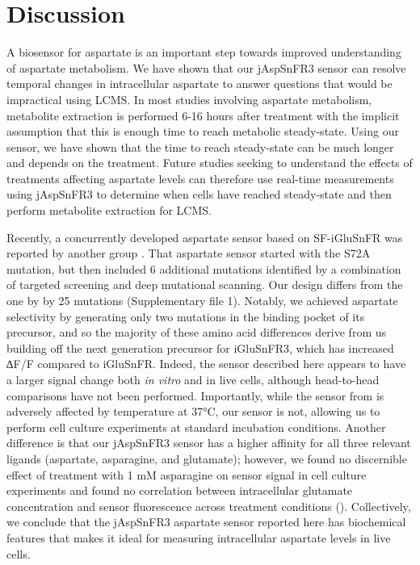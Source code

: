 \documentclass[9pt,lineno]{elife}
\begin{document}
\section{Discussion}
A biosensor for aspartate is an important step towards improved understanding of aspartate metabolism.
We have shown that our jAspSnFR3 sensor can resolve temporal changes in intracellular aspartate to answer questions that would be impractical using LCMS.
In most studies involving aspartate metabolism, metabolite extraction is performed 6-16 hours after treatment with the implicit assumption that this is enough time to reach metabolic steady-state.
Using our sensor, we have shown that the time to reach steady-state can be much longer and depends on the treatment.
Future studies seeking to understand the effects of treatments affecting aspartate levels can therefore use real-time measurements using jAspSnFR3 to determine when cells have reached steady-state and then perform metabolite extraction for LCMS.

Recently, a concurrently developed aspartate sensor based on SF-iGluSnFR was reported by another group \citep{Hellweg2023}.
That aspartate sensor started with the S72A mutation, but then included 6 additional mutations identified by a combination of targeted screening and deep mutational scanning.
Our design differs from the one by \cite{Hellweg2023} by 25 mutations (Supplementary file 1).
Notably, we achieved aspartate selectivity by generating only two mutations in the binding pocket of its precursor, and so the majority of these amino acid differences derive from us building off the next generation precursor for iGluSnFR3, which has increased ∆F/F compared to iGluSnFR.
Indeed, the sensor described here appears to have a larger signal change both \textit{in vitro} and in live cells, although head-to-head comparisons have not been performed.
Importantly, while the sensor from \cite{Hellweg2023} is adversely affected by temperature at 37°C, our sensor is not, allowing us to perform cell culture experiments at standard incubation conditions.
Another difference is that our jAspSnFR3 sensor has a higher affinity for all three relevant ligands (aspartate, asparagine, and glutamate); however, we found no discernible effect of treatment with 1 mM asparagine on sensor signal in cell culture experiments and found no correlation between intracellular glutamate concentration and sensor fluorescence across treatment conditions ().
Collectively, we conclude that the jAspSnFR3 aspartate sensor reported here has biochemical features that makes it ideal for measuring intracellular aspartate levels in live cells.
\end{document}
